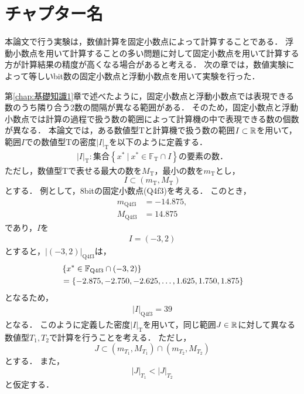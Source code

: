 \chapter {チャプター名}
\label{chap:提案手法}
本論文で行う実験は，数値計算を固定小数点によって計算することである．
浮動小数点を用いて計算することの多い問題に対して固定小数点を用いて計算する方が計算結果の精度が高くなる場合があると考える．
次の章では，数値実験によって等しいbit数の固定小数点と浮動小数点を用いて実験を行った．


第\ref{chap:基礎知識1}章で述べたように，固定小数点と浮動小数点では表現できる数のうち隣り合う2数の間隔が異なる範囲がある．
そのため，固定小数点と浮動小数点では計算の過程で扱う数の範囲によって計算機の中で表現できる数の個数が異なる． %
本論文では，ある数値型$\mathrm{T}$と計算機で扱う数の範囲$I \subset \mathbb{R}$を用いて，範囲$I$での数値型$\mathrm{T}$の密度${|I|}_{\mathrm{T}}$を以下のように定義する．
\begin{align}
    \label{eq:def_density}
    {|I|}_{\mathrm{T}}: \text{集合}\left\{x^{\ast} \ | \ x^{\ast} \in \mathbb{F}_{\mathrm{T}} \cap I \right\}\text{の要素の数．}
\end{align}
ただし，数値型$\mathrm{T}$で表せる最大の数を$M_{\mathrm{T}}$，最小の数を$m_{\mathrm{T}}$とし，
\begin{equation}
    I \subset (m_{\mathrm{T}}, M_{\mathrm{T}})
\end{equation}
とする．
例として，8bitの固定小数点(Q4f3)を考える．
このとき，
\begin{align}
    m_{\mathrm{Q}4\mathrm{f}3} &= -14.875, \\
    M_{\mathrm{Q}4\mathrm{f}3} &= 14.875
\end{align}
であり，$I$を
\begin{eqnarray}
    I = \left(-3,2\right)
\end{eqnarray}
とすると，${|\left(-3,2\right)|}_{\mathrm{Q}4\mathrm{f}3}$は，
\begin{align}
    &\left\{x^{\ast}\in \mathbb{F}_{\text{Q}{4}\text{f}{3}} \cap (-3,2)\right\} \\
    &= \left\{-2.875,-2.750,-2.625,\dots,1.625,1.750,1.875\right\}
\end{align}
となるため，
\begin{align}
    {|I|}_{\mathrm{Q}4\mathrm{f}3} = 39
\end{align}
となる．
このように定義した密度${|I|}_{\mathrm{T}}$を用いて，同じ範囲$J \in \mathbb{R}$に対して異なる数値型$T_1,T_2$で計算を行うことを考える．
ただし，
\begin{equation}
    J \subset (m_{T_1}, M_{T_1}) \cap (m_{T_2}, M_{T_2})
\end{equation}
とする．
また，
\begin{equation}
    {|J|}_{T_1} < {|J|}_{T_2}
\end{equation}
と仮定する．

